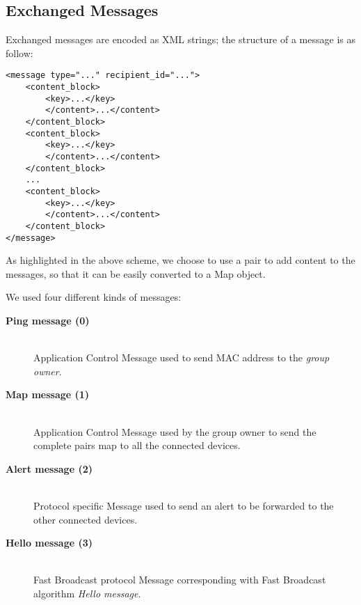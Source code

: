 \subsection{Exchanged Messages}

Exchanged messages are encoded as XML strings; the structure of a message is as follow:
\begin{verbatim}
<message type="..." recipient_id="...">
    <content_block>
        <key>...</key>
        </content>...</content>
    </content_block>
    <content_block>
        <key>...</key>
        </content>...</content>
    </content_block>
    ...
    <content_block>
        <key>...</key>
        </content>...</content>
    </content_block>
</message>
\end{verbatim}
As highlighted in the above scheme, we choose to use a  pair to add content to the messages, so that it can be easily converted to a Map object.

We used four different kinds of messages:
	\begin{description}
		\item[\textbf{Ping message (0)}] \hfill \\
		Application Control Message used to send MAC address to the \textit{group owner}.
		\item[\textbf{Map message (1)}] \hfill \\
		Application Control Message used by the group owner to send the complete  pairs map to all the connected devices.
		\item[\textbf{Alert message (2)}] \hfill \\
		Protocol specific Message used to send an alert to be forwarded to the other connected devices.
		\item[\textbf{Hello message (3)}] \hfill \\
		Fast Broadcast protocol Message corresponding with Fast Broadcast algorithm \textit{Hello message}.
	\end{description}

